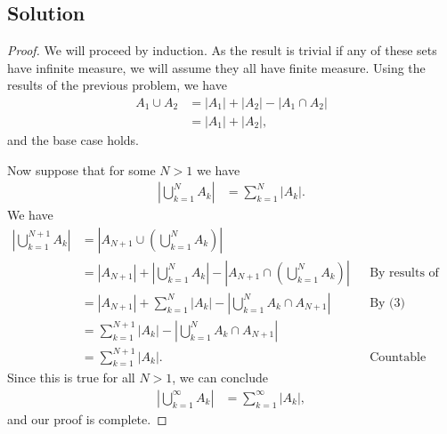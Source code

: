 \documentclass[10pt,a4paper]{article}
\theoremstyle{theorem}
\theoremstyle{definition}
\begin{document}
\subsection*{Solution}
\begin{proof}
We will proceed by induction.  As the result is trivial if any of these sets have infinite measure, we will assume they all have finite measure. Using the results of the previous problem, we have
\begin{align*}
A_1 \cup A_2 &= |A_1| + |A_2| - |A_1 \cap A_2|\\
&= |A_1| + |A_2|,
\end{align*}
and the base case holds.

Now suppose that for some $N > 1$ we have 
\begin{align}
\left| \bigcup_{k=1}^N A_k \right| &= \sum_{k=1}^N |A_k|.
\end{align}
We have 
\begin{align*}
\left| \bigcup_{k=1}^{N+1} A_k \right| &= \left| A_{N+1} \cup \left(\bigcup_{k=1}^N A_k \right) \right|\\
&= |A_{N+1}| + \left| \bigcup_{k=1}^N A_k \right| -   \left| A_{N+1} \cap \left(\bigcup_{k=1}^N A_k \right) \right| &&\text{By results of previous problem}\\
&= |A_{N+1}| + \sum_{k=1}^N |A_k| - \left| \bigcup_{k=1}^N A_k \cap A_{N+1} \right|  &&\text{By (3)}\\
&=\sum_{k=1}^{N + 1} |A_k| - \left| \bigcup_{k=1}^N A_k \cap A_{N+1} \right| \\
&= \sum_{k=1}^{N + 1} |A_k|. &&\text{Countable union of sets of measure zero}
\end{align*}
Since this is true for all $N > 1$, we can conclude 
\begin{align*}
\left| \bigcup_{k=1}^\infty A_k \right| &= \sum_{k=1}^\infty |A_k|,
\end{align*}
and our proof is complete.
\end{proof}
\end{document}
